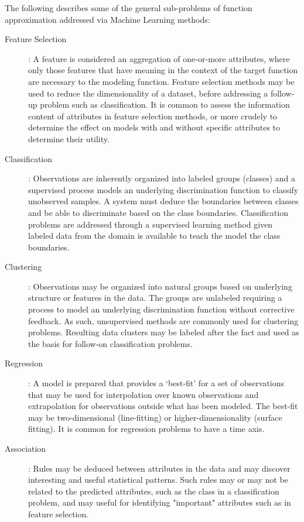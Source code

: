 \documentclass[a4paper, 11pt]{article}
\begin{document}
The following describes some of the general sub-problems of function approximation addressed via Machine Learning methods:

\begin{description}
	\item[Feature Selection]: A feature is considered an aggregation of one-or-more attributes, where only those features that have meaning in the context of the target function are necessary to the modeling function. Feature selection methods may be used to reduce the dimensionality of a dataset, before addressing a follow-up problem such as classification. It is common to assess the information content of attributes in feature selection methods, or more crudely to determine the effect on models with and without specific attributes to determine their utility.
	
	\item[Classification]: Observations are inherently organized into labeled groups (classes) and a supervised process models an underlying discrimination function to classify unobserved samples. A system must deduce the boundaries between classes and be able to discriminate based on the class boundaries. Classification problems are addressed through a supervised learning method given labeled data from the domain is available to teach the model the class boundaries. 
	
	\item[Clustering]: Observations may be organized into natural groups based on underlying structure or features in the data. The groups are unlabeled requiring a process to model an underlying discrimination function without corrective feedback. As such, unsupervised methods are commonly used for clustering problems. Resulting data clusters may be labeled after the fact and used as the basis for follow-on classification problems.
	
	\item[Regression]: A model is prepared that provides a `best-fit' for a set of observations that may be used for interpolation over known observations and extrapolation for observations outside what has been modeled. The best-fit may be two-dimensional (line-fitting) or higher-dimensionality (surface fitting). It is common for regression problems to have a time axis.
	
	\item[Association]: Rules may be deduced between attributes in the data and may discover interesting and useful statistical patterns. Such rules may or may not be related to the predicted attributes, such as the class in a classification problem, and may useful for identifying "important" attributes such as in feature selection.
		
\end{description}
\end{document}
